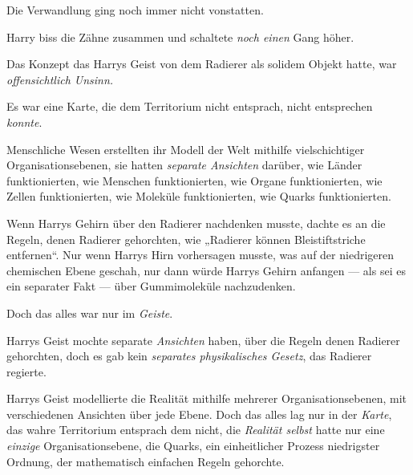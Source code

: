 Die Verwandlung ging noch immer nicht vonstatten.

Harry biss die Zähne zusammen und schaltete \emph{noch einen} Gang höher.

Das Konzept das Harrys Geist von dem Radierer als solidem Objekt hatte, war \emph{offensichtlich Unsinn.}

Es war eine Karte, die dem Territorium nicht entsprach, nicht entsprechen \emph{konnte}.

Menschliche Wesen erstellten ihr Modell der Welt mithilfe vielschichtiger Organisationsebenen, sie hatten \emph{separate Ansichten} darüber, wie Länder funktionierten, wie Menschen funktionierten, wie Organe funktionierten, wie Zellen funktionierten, wie Moleküle funktionierten, wie Quarks funktionierten.

Wenn Harrys Gehirn über den Radierer nachdenken musste, dachte es an die Regeln, denen Radierer gehorchten, wie
„Radierer können Bleistiftstriche entfernen“. Nur wenn Harrys Hirn vorhersagen musste, was auf der niedrigeren chemischen Ebene geschah, nur dann würde Harrys Gehirn anfangen — als sei es ein separater Fakt — über Gummimoleküle nachzudenken.

Doch das alles war nur im \emph{Geiste}.

Harrys Geist mochte separate \emph{Ansichten} haben, über die Regeln denen Radierer gehorchten, doch es gab kein \emph{separates physikalisches Gesetz}, das Radierer regierte.

Harrys Geist modellierte die Realität mithilfe mehrerer Organisationsebenen, mit verschiedenen Ansichten über jede Ebene. Doch das alles lag nur in der \emph{Karte}, das wahre Territorium entsprach dem nicht, die \emph{Realität selbst} hatte nur eine \emph{einzige} Organisationsebene, die Quarks, ein einheitlicher Prozess niedrigster Ordnung, der mathematisch einfachen Regeln gehorchte.

